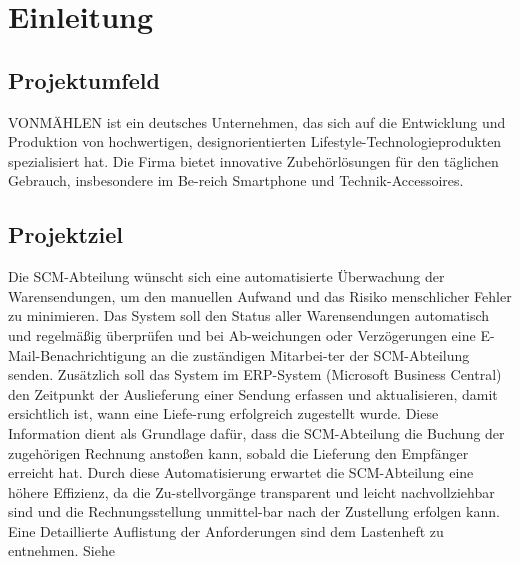 \section{Einleitung}
\label{sec:Einleitung}

\subsection{Projektumfeld} 
\label{sec:Projektumfeld}
VONMÄHLEN ist ein deutsches Unternehmen, das sich auf die Entwicklung und Produktion von hochwertigen, 
designorientierten Lifestyle-Technologieprodukten spezialisiert hat. Die Firma bietet innovative Zubehörlösungen für den täglichen Gebrauch, 
insbesondere im Be-reich Smartphone und Technik-Accessoires.

\subsection{Projektziel} 
\label{sec:Projektziel}
Die SCM-Abteilung wünscht sich eine automatisierte Überwachung der Warensendungen, um den manuellen Aufwand und das Risiko menschlicher Fehler zu minimieren. Das System soll den Status aller Warensendungen automatisch und regelmäßig überprüfen und bei Ab-weichungen oder Verzögerungen eine E-Mail-Benachrichtigung an die zuständigen Mitarbei-ter der SCM-Abteilung senden.
Zusätzlich soll das System im ERP-System (Microsoft Business Central) den Zeitpunkt der Auslieferung einer Sendung erfassen und aktualisieren, damit ersichtlich ist, wann eine Liefe-rung erfolgreich zugestellt wurde. Diese Information dient als Grundlage dafür, dass die SCM-Abteilung die Buchung der zugehörigen Rechnung anstoßen kann, sobald die Lieferung den Empfänger erreicht hat. 
Durch diese Automatisierung erwartet die SCM-Abteilung eine höhere Effizienz, da die Zu-stellvorgänge transparent und leicht nachvollziehbar sind und die Rechnungsstellung unmittel-bar nach der Zustellung erfolgen kann.
Eine Detaillierte Auflistung der Anforderungen sind dem Lastenheft zu entnehmen. 
Siehe 


